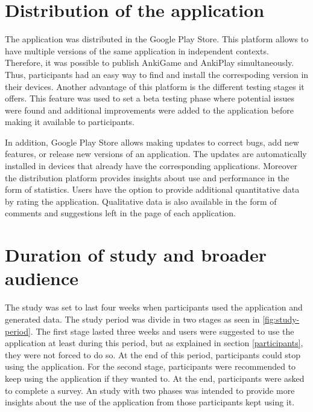 \section{Distribution of the application}
The application was distributed in the Google Play Store. This platform allows to have multiple versions of the same application in independent contexts. Therefore, it was possible to publish AnkiGame and AnkiPlay simultaneously. Thus, participants had an easy way to find and install the correspoding version in their devices. Another advantage of this platform is the different testing stages it offers. This feature was used to set a beta testing phase where potential issues were found and additional improvements were added to the application before making it available to participants.

In addition, Google Play Store allows making updates to correct bugs, add new features, or release new versions of an application. The updates are automatically installed in devices that already have the corresponding applications. Moreover the distribution platform provides insights about use and performance in the form of statistics. Users have the option to provide additional quantitative data by rating the application. Qualitative data is also available in the form of comments and suggestions left in the page of each application.

\section{Duration of study and broader audience}
The study was set to last four weeks when participants used the application and generated data. The study period was divide in two stages as seen in \ref{fig:study-period}. The first stage lasted three weeks and users were suggested to use the application at least during this period, but as explained in section \ref{participants}, they were not forced to do so. At the end of this period, participants could stop using the application. For the second stage, participants were recommended to keep using the application if they wanted to. At the end, participants were asked to complete a survey. An study with two phases was intended to provide more insights about the use of the application from those participants kept using it.

